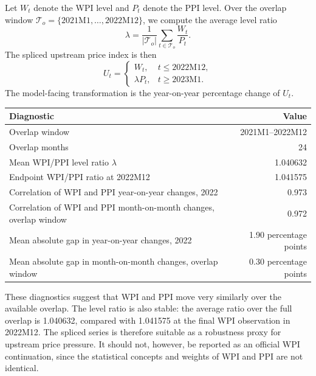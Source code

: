 \noindent Let $W_t$ denote the WPI level and $P_t$ denote the PPI level. Over the overlap window $\mathcal{T}_o = \{2021\mathrm{M}1,\ldots,2022\mathrm{M}12\}$, we compute the average level ratio
\begin{equation}
\lambda = \frac{1}{|\mathcal{T}_o|}\sum_{t \in \mathcal{T}_o} \frac{W_t}{P_t}.
\end{equation}
The spliced upstream price index is then
\begin{equation}
U_t =
\begin{cases}
W_t, & t \leq 2022\mathrm{M}12,\\
\lambda P_t, & t \geq 2023\mathrm{M}1.
\end{cases}
\end{equation}
The model-facing transformation is the year-on-year percentage change of $U_t$.

\begin{center}
\small
\setlength{\tabcolsep}{6pt}
\renewcommand{\arraystretch}{1.1}
\begin{tabular}{l r}
\hline
\textbf{Diagnostic} & \textbf{Value} \\
\hline
Overlap window & 2021M1--2022M12 \\
Overlap months & 24 \\
Mean WPI/PPI level ratio $\lambda$ & 1.040632 \\
Endpoint WPI/PPI ratio at 2022M12 & 1.041575 \\
Correlation of WPI and PPI year-on-year changes, 2022 & 0.973 \\
Correlation of WPI and PPI month-on-month changes, overlap window & 0.972 \\
Mean absolute gap in year-on-year changes, 2022 & 1.90 percentage points \\
Mean absolute gap in month-on-month changes, overlap window & 0.30 percentage points \\
\hline
\end{tabular}
\end{center}

\noindent These diagnostics suggest that WPI and PPI move very similarly over the available overlap. The level ratio is also stable: the average ratio over the full overlap is 1.040632, compared with 1.041575 at the final WPI observation in 2022M12. The spliced series is therefore suitable as a robustness proxy for upstream price pressure. It should not, however, be reported as an official WPI continuation, since the statistical concepts and weights of WPI and PPI are not identical.

